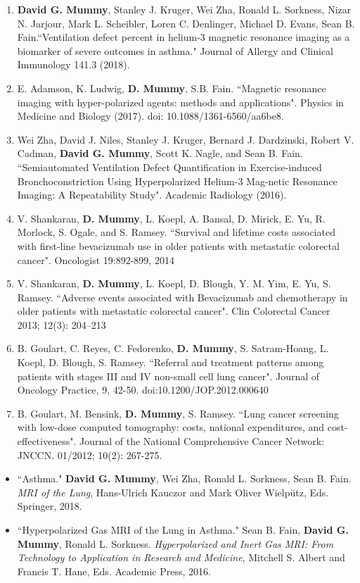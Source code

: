 \documentclass[10pt]{article}
\renewcommand{\section}[1]{\pagebreak[3]%
    \hyphenpenalty=10000%
    \vspace{1.3\baselineskip}%
    \phantomsection\addcontentsline{toc}{section}{#1}%
    \noindent\llap{\scshape\smash{\parbox[t]{\marginparwidth}{\raggedright #1}}}%
    \vspace{-\baselineskip}\par}
\newenvironment{innerlist}[1][\enskip\textbullet]%
        {\begin{itemize}[#1,leftmargin=*,parsep=0pt,itemsep=0pt,topsep=0pt,partopsep=0pt]}
        {\end{itemize}}
\begin{document}
\begin{enumerate}
\item {\bf David G. Mummy}, Stanley J. Kruger, Wei Zha, Ronald L. Sorkness, Nizar N. Jarjour, Mark L. Scheibler, Loren C. Denlinger, Michael D. Evans, Sean B. Fain.``Ventilation defect percent in helium-3 magnetic resonance imaging as a biomarker of severe outcomes in asthma." Journal of Allergy and Clinical Immunology 141.3 (2018). 
\item E. Adamson, K. Ludwig, {\bf D. Mummy}, S.B. Fain. ``Magnetic resonance imaging with hyper-polarized agents: methods and applications". Physics in Medicine and Biology (2017). doi: 10.1088/1361-6560/aa6be8.
    \item Wei Zha, David J. Niles, Stanley J. Kruger, Bernard J. Dardzinski, Robert V. Cadman, {\bf David G. Mummy}, Scott K. Nagle, and Sean B. Fain. ``Semiautomated Ventilation Defect Quantification in Exercise-induced Bronchoconstriction Using Hyperpolarized Helium-3 Mag-netic Resonance Imaging: A Repeatability Study". Academic Radiology (2016).
    \item V. Shankaran, {\bf D. Mummy}, L. Koepl, A. Bansal, D. Mirick, E. Yu, R. Morlock, S. Ogale, and S. Ramsey. ``Survival and lifetime costs associated with first-line bevacizumab use in older patients with metastatic colorectal cancer". Oncologist 19:892-899, 2014
    \item V. Shankaran, {\bf D. Mummy}, L. Koepl, D. Blough, Y. M. Yim, E. Yu, S. Ramsey. ``Adverse events associated with Bevacizumab and chemotherapy in older patients with metastatic colorectal cancer". Clin Colorectal Cancer 2013; 12(3): 204–213
	\item B. Goulart, C. Reyes, C. Fedorenko, {\bf D. Mummy}, S. Satram-Hoang, L. Koepl, D. Blough, S. Ramsey. ``Referral and treatment patterns among patients with stages III and IV non-small cell lung cancer". Journal of Oncology Practice, 9, 42-50. doi:10.1200/JOP.2012.000640
	\item B. Goulart, M. Bensink, {\bf D. Mummy}, S. Ramsey. ``Lung cancer screening with low-dose computed tomography: costs, national expenditures, and cost-effectiveness". Journal of the National Comprehensive Cancer Network: JNCCN. 01/2012; 10(2): 267-275.
\end{enumerate}


\section{Book Chapters}

\begin{innerlist}
    \item ``Asthma." {\bf David G. Mummy}, Wei Zha, Ronald L. Sorkness, Sean B. Fain. \textit{MRI of the Lung}, Hans-Ulrich Kauczor and Mark Oliver Wielp{\"u}tz, Eds. Springer, 2018. 
    \item ``Hyperpolarized Gas MRI of the Lung in Asthma." Sean B. Fain, {\bf David G. Mummy}, Ronald L. Sorkness. \textit{Hyperpolarized and Inert Gas MRI: From Technology to Application in Research and Medicine}, Mitchell S. Albert and Francis T. Hane, Eds. Academic Press, 2016.
  
\end{innerlist}
\end{document}
